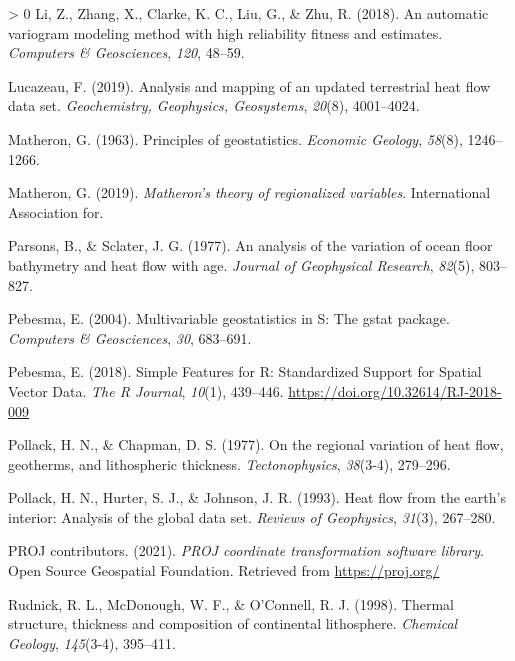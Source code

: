 \documentclass[draft,linenumbers]{agujournal2018}
\newlength{\cslhangindent}
\newenvironment{CSLReferences}[3] %
 {%
  \setlength{\parindent}{0pt}
  \ifodd #1 \everypar{\setlength{\hangindent}{\cslhangindent}}\ignorespaces\fi
  \ifnum #2 > 0
  \setlength{\parskip}{#2\baselineskip}
  \fi
 }%
 {}
\begin{document}
\begin{CSLReferences}{1}{0}
\leavevmode\hypertarget{ref-li2018}{}%
Li, Z., Zhang, X., Clarke, K. C., Liu, G., \& Zhu, R. (2018). An
automatic variogram modeling method with high reliability fitness and
estimates. \emph{Computers \& Geosciences}, \emph{120}, 48--59.

\leavevmode\hypertarget{ref-lucazeau2019}{}%
Lucazeau, F. (2019). Analysis and mapping of an updated terrestrial heat
flow data set. \emph{Geochemistry, Geophysics, Geosystems},
\emph{20}(8), 4001--4024.

\leavevmode\hypertarget{ref-matheron1963}{}%
Matheron, G. (1963). Principles of geostatistics. \emph{Economic
Geology}, \emph{58}(8), 1246--1266.

\leavevmode\hypertarget{ref-matheron2019}{}%
Matheron, G. (2019). \emph{Matheron's theory of regionalized variables}.
International Association for.

\leavevmode\hypertarget{ref-parsons1977}{}%
Parsons, B., \& Sclater, J. G. (1977). An analysis of the variation of
ocean floor bathymetry and heat flow with age. \emph{Journal of
Geophysical Research}, \emph{82}(5), 803--827.

\leavevmode\hypertarget{ref-pebesma2004}{}%
Pebesma, E. (2004). Multivariable geostatistics in {S}: The gstat
package. \emph{Computers \& Geosciences}, \emph{30}, 683--691.

\leavevmode\hypertarget{ref-pebesma2018}{}%
Pebesma, E. (2018). {Simple Features for R: Standardized Support for
Spatial Vector Data}. \emph{{The R Journal}}, \emph{10}(1), 439--446.
\url{https://doi.org/10.32614/RJ-2018-009}

\leavevmode\hypertarget{ref-pollack1977}{}%
Pollack, H. N., \& Chapman, D. S. (1977). On the regional variation of
heat flow, geotherms, and lithospheric thickness. \emph{Tectonophysics},
\emph{38}(3-4), 279--296.

\leavevmode\hypertarget{ref-pollack1993}{}%
Pollack, H. N., Hurter, S. J., \& Johnson, J. R. (1993). Heat flow from
the earth's interior: Analysis of the global data set. \emph{Reviews of
Geophysics}, \emph{31}(3), 267--280.

\leavevmode\hypertarget{ref-proj2021}{}%
PROJ contributors. (2021). \emph{{PROJ} coordinate transformation
software library}. Open Source Geospatial Foundation. Retrieved from
\url{https://proj.org/}

\leavevmode\hypertarget{ref-rudnick1998}{}%
Rudnick, R. L., McDonough, W. F., \& O'Connell, R. J. (1998). Thermal
structure, thickness and composition of continental lithosphere.
\emph{Chemical Geology}, \emph{145}(3-4), 395--411.


\end{CSLReferences}
\end{document}
